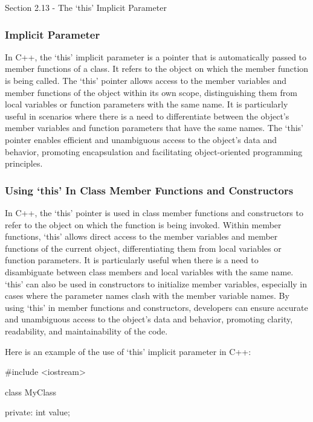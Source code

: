 \begin{notes}{Section 2.13 - The `this' Implicit Parameter}
    \subsubsection*{Implicit Parameter}

    In C++, the `this' implicit parameter is a pointer that is automatically passed to member functions of a class. It refers to the object on which the member function is being called. The `this' pointer allows access to the member variables and member functions of the object within its own scope, 
    distinguishing them from local variables or function parameters with the same name. It is particularly useful in scenarios where there is a need to differentiate between the object's member variables and function parameters that have the same names. The `this' pointer enables efficient and unambiguous 
    access to the object's data and behavior, promoting encapsulation and facilitating object-oriented programming principles.
    
    \subsubsection*{Using `this' In Class Member Functions and Constructors}
    
    In C++, the `this' pointer is used in class member functions and constructors to refer to the object on which the function is being invoked. Within member functions, `this' allows direct access to the member variables and member functions of the current object, differentiating them from local variables 
    or function parameters. It is particularly useful when there is a need to disambiguate between class members and local variables with the same name. `this' can also be used in constructors to initialize member variables, especially in cases where the parameter names clash with the member variable names. 
    By using `this' in member functions and constructors, developers can ensure accurate and unambiguous access to the object's data and behavior, promoting clarity, readability, and maintainability of the code.
    
    \begin{highlight}
        Here is an example of the use of `this' implicit parameter in C++:
    \begin{code}[C++]
    #include <iostream>

    class MyClass {
    private:
        int value;
    
}
\end{code}
\end{highlight}
\end{notes}
